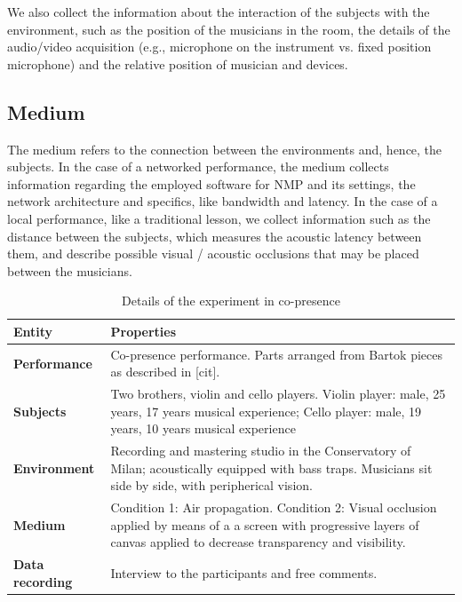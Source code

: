 We also collect the information about the interaction of the subjects with the environment, such as the position of the musicians in the room, the details of the audio/video acquisition (e.g., microphone on the instrument vs. fixed position microphone) and the relative position of musician and devices. 

\subsection{Medium}
The medium refers to the connection between the environments and, hence, the subjects. In the case of a networked performance, the medium collects information regarding the employed software for NMP and its settings, the network architecture and specifics, like bandwidth and latency. In the case of a local performance, like a traditional lesson, we collect information such as the distance between the subjects, which measures the acoustic latency between them, and describe possible visual / acoustic occlusions that may be placed between the musicians. 


\begin{table}
	\centering
	\caption{Details of the experiment in co-presence}
	\begin{tabular}{p{1.5cm}p{6cm}}
		\hline
		\textbf{Entity} & \textbf{Properties} \\
		\hline
		\textbf{Performance} & Co-presence performance. \newline Parts arranged from Bartok pieces as described in [cit]. \\
		\textbf{Subjects} & Two brothers, violin and cello players. \newline Violin player: male, 25 years, 17 years musical experience; 	\newline Cello player: male, 19 years, 10 years  musical experience \\
		\textbf{Environment} & Recording and mastering studio in the Conservatory of Milan; acoustically equipped with bass traps. \newline Musicians sit side by side, with peripherical vision.\\
		\textbf{Medium} & Condition 1: Air propagation. \newline Condition 2: Visual occlusion applied by means of a a screen with progressive layers of canvas applied to decrease transparency and visibility. \\
		\textbf{Data} \newline \textbf{recording}  & Interview to the participants and free comments.\\
		\hline
	\end{tabular}
	\label{tab:exp1}
\end{table}



